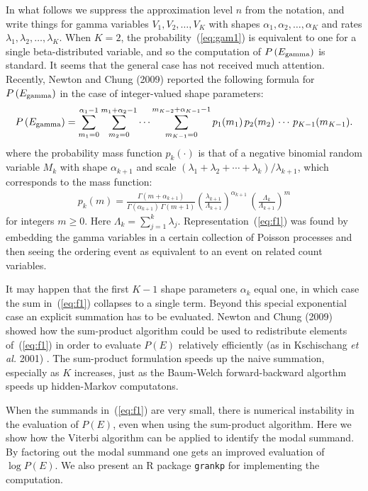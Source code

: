 In what follows we suppress the approximation level $n$ from the notation, 
and write things for
gamma variables $V_1, V_2, \ldots, V_K$ with shapes $\alpha_1, 
\alpha_2, \ldots, \alpha_K$ and rates $\lambda_1, \lambda_2, \ldots,
 \lambda_K$.
 When $K=2$, the probability~(\ref{eq:gam1}) 
 is equivalent to one for a single beta-distributed
 variable, and so the computation of
  $P\left(E_{\rm gamma}\right)$ is standard.  It seems that
 the general case has not received much attention.
 Recently, Newton and Chung (2009) reported the following formula
 for $P\left(E_{\rm gamma}\right)$ 
 in the case of integer-valued shape parameters:
\begin{eqnarray}
\label{eq:f1}
P\left(E_{\rm gamma} \right) = \sum_{m_1=0}^{\alpha_1 - 1} 
 \sum_{m_2=0}^{m_1+\alpha_2 -1 }
   \cdots \sum_{m_{K-1} = 0 }^{m_{K-2} + \alpha_{K-1} - 1 }
   p_1(m_1) \, p_2(m_2) \, \cdots \, p_{K-1}(m_{K-1}).
\end{eqnarray}
where the probability mass function $p_k(\cdot)$ is that of a
negative binomial random variable $M_k$ with shape $\alpha_{k+1}$ and
 scale $( \lambda_1 + \lambda_2 + \cdots + \lambda_k )/\lambda_{k+1}$,
which corresponds to the mass function:
\begin{eqnarray}
\label{eq:nb}
p_k(m) = \frac{ \Gamma( m+\alpha_{k+1} ) }{ \Gamma( \alpha_{k+1} )
  \, \Gamma(m+1) }
         \left( \frac{\lambda_{k+1}}{\Lambda_{k+1}} \right)^{\alpha_{k+1}} \,
         \left( \frac{\Lambda_k}{\Lambda_{k+1} } \right)^{m} 
\end{eqnarray}
for integers $m \geq 0$. Here $\Lambda_k = \sum_{j=1}^k \lambda_j$.
Representation~(\ref{eq:f1}) was found by embedding the gamma variables
in a certain collection of Poisson processes and then seeing the ordering
event as equivalent to an event on related count variables.  

It may happen that the first $K-1$ shape parameters $\alpha_k$ equal one,
in which case the sum in~(\ref{eq:f1}) collapses to a single term.
Beyond this special 
exponential case an explicit summation has to be evaluated.
Newton and Chung (2009) showed how the sum-product algorithm could be
used to redistribute elements of~(\ref{eq:f1}) in order to evaluate
$P(E)$ relatively efficiently (as in Kschischang {\em et al.} 2001) . 
The sum-product formulation speeds
up the naive summation, especially as $K$ increases, just as
the Baum-Welch forward-backward algorthm speeds up hidden-Markov
computatons.

When the summands in~(\ref{eq:f1})  are very small, there is
numerical instability in the evaluation of $P(E)$, even when
using the sum-product algorithm.  
Here we show how the Viterbi algorithm can be applied to 
identify the modal summand.  By factoring out the modal summand 
one gets an improved evaluation of $\log P(E)$. 
We also present an R package \verb+grankp+ for implementing the computation.

